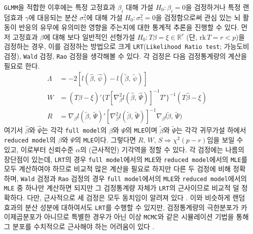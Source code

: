 \documentclass[11pt,onecolumn,twoside,a4size]{gsag3jnl}
\begin{document}
\texttt{GLMM}을 적합한 이후에는 특정 고정효과 $\beta_i$ 대해 가설 $H_0:\beta_i=0$을 검정하거나 특정 랜덤효과 $\gamma$에 대응되는 분산 $\sigma_\gamma^2$에 대해 가설 $H_0:\sigma^2_\gamma=0$을 검정함으로써 관심 있는 뇌 활동이 반응의 유무에 유의미한 영향을 주는지에 대한 통계적 추론을 진행할 수 있다. 먼저 고정효과 $\beta$에 대해 보다 일반적인 선형가설 $H_0:T\beta=\xi\in\mathbb{R}^r$ (단, $\mathrm{rk}\,T=r<p$)을 검정하는 경우, 이를 검정하는 방법으로 크게 \texttt{LRT}(\texttt{Likelihood Ratio test}; 가능도비 검정), \texttt{Wald} 검정, \texttt{Rao} 검정을 생각해볼 수 있다. 각 검정은 다음 검정통계량의 계산을 필요로 한다.
\begin{align}
  \Lambda&=-2[l(\widehat{\beta},\,\widehat{\psi})-l(\widetilde{\beta},\,\widetilde{\psi})]\\
  W&=(T\widehat{\beta}-\xi)'\{T[\nabla^2_\beta l(\widehat{\beta},\,\widehat{\Psi})]^{-1}T'\}^{-1}(T\widehat{\beta}-\xi)\\
  R&=\nabla_\beta l(\widetilde{\beta},\,\widetilde{\Psi})'[\nabla^2_\beta l(\widetilde{\beta},\,\widetilde{\Psi})]^{-1}\nabla_\beta l\widetilde{\beta},\,\widetilde{\Psi})
\end{align}
여기서 $\widehat{\beta}$와 $\widehat{\Psi}$는 각각 \texttt{full model}의 $\beta$와 $\Psi$의 \texttt{MLE}이며 $\widetilde{\beta}$와 $\widetilde{\Psi}$는 각각 귀무가설 하에서 \texttt{reduced model}의 $\beta$와 $\Psi$의 \texttt{MLE}이다. 그렇다면 $R,\,W,\,S\Rightarrow\chi^2(p-r)$임을 보일 수 있고, 이로부터 신뢰수준 $\alpha$의 (근사적인) 기각역을 정할 수 있다. 각 검정에는 나름의 장단점이 있는데, \texttt{LRT}의 경우 \texttt{full model}에서의 \texttt{MLE}와 \texttt{reduced model}에서의 \texttt{MLE}를 모두 계산하여야 하므로 비교적 많은 계산을 필요로 하지만 다른 두 검정에 비해 정확하며, \texttt{Wald} 검정과 \texttt{Rao} 검정의 경우 \texttt{full model}에서의 \texttt{MLE}와 \texttt{reduced model}에서의 \texttt{MLE} 중 하나만 계산하면 되지만 그 검정통계량 자체가 \texttt{LRT}의 근사이므로 비교적 덜 정확하다. 다만, 근사적으로 세 검정은 모두 동치임이 알려져 있다 \texttt{\citep{tuerlinckx2006statistical}}. 이와 비슷하게 랜덤효과의 분산 성분에 대하여서도 \texttt{LRT}를 수행할 수 있지만, 검정통계량의 극한분포가 카이제곱분포가 아니므로 특별한 경우가 아닌 이상 \texttt{MCMC}와 같은 시뮬레이션 기법을 통해 그 분포를 수치적으로 근사해야 하는 어려움이 있다 \texttt{\citep{zhang2008variance}}.
\end{document}
